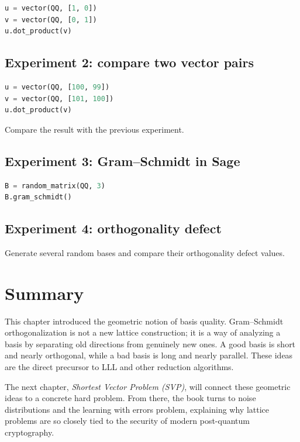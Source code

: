 \begin{lstlisting}[language=Python]
u = vector(QQ, [1, 0])
v = vector(QQ, [0, 1])
u.dot_product(v)
\end{lstlisting}

\subsection{Experiment 2: compare two vector pairs}

\begin{lstlisting}[language=Python]
u = vector(QQ, [100, 99])
v = vector(QQ, [101, 100])
u.dot_product(v)
\end{lstlisting}

Compare the result with the previous experiment.

\subsection{Experiment 3: Gram--Schmidt in Sage}

\begin{lstlisting}[language=Python]
B = random_matrix(QQ, 3)
B.gram_schmidt()
\end{lstlisting}

\subsection{Experiment 4: orthogonality defect}
Generate several random bases and compare their orthogonality defect values.

\section{Summary}
This chapter introduced the geometric notion of basis quality. Gram--Schmidt orthogonalization is not a new lattice construction; it is a way of analyzing a basis by separating old directions from genuinely new ones. A good basis is short and nearly orthogonal, while a bad basis is long and nearly parallel. These ideas are the direct precursor to LLL and other reduction algorithms.

The next chapter, \emph{Shortest Vector Problem (SVP)}, will connect these geometric ideas to a concrete hard problem. From there, the book turns to noise distributions and the learning with errors problem, explaining why lattice problems are so closely tied to the security of modern post-quantum cryptography.

\printbibliography[heading=chapterrefs]
